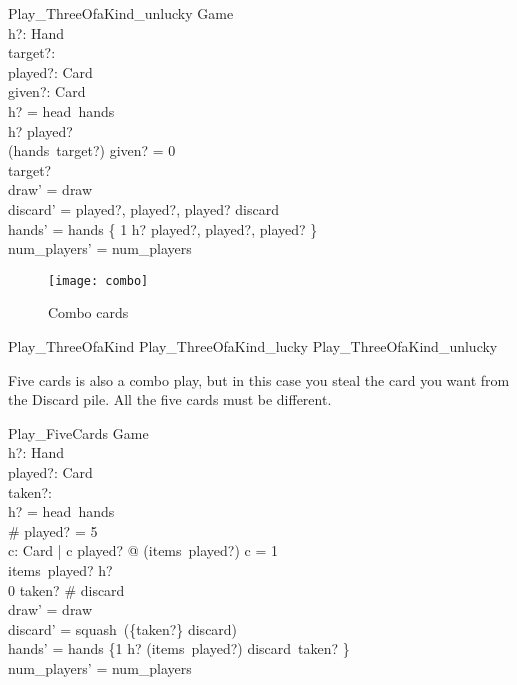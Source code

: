 \documentclass[11pt, fuzz]{article}
\begin{document}
\begin{schema}{Play\_ThreeOfaKind\_unlucky}
    \Delta Game \\
    h?: Hand \\
    target?: \nat \\
    played?: Card \\
    given?: Card \\
\where
    h? = head~hands \\
    h? \bcount played?  \\
    (hands~target?) \bcount given? = 0 \\
    target?  \\
    draw' = draw \\
    discard' = \langle played?, played?, played? \rangle \cat discard \\
    hands' = hands \oplus \{ 1 \mapsto h? \uminus \lbag played?, played?, played? \rbag \} \\
    num\_players' = num\_players
\end{schema}

\begin{figure}
    \texttt{[image: combo]}
    \caption{Combo cards}
\end{figure}


\begin{zed}
Play\_ThreeOfaKind  Play\_ThreeOfaKind\_lucky \lor Play\_ThreeOfaKind\_unlucky
\end{zed}


Five cards is also a combo play, but in this case you steal the card you want from the Discard pile. All the five cards must be different. 

\begin{schema}{Play\_FiveCards}
    \Delta Game \\
    h?: Hand \\
    played?: \seq Card \\
    taken?: \nat \\
\where
    h? = head~hands \\
    \# played? = 5 \\
    \forall c: Card | c \in \ran played? @ (items~played?) \bcount c = 1 \\ 
    items~played? \subbageq h? \\
    0 \leq taken? \leq \# discard \\
    draw' = draw \\
    discard' = squash~(\{taken?\} \ndres discard) \\ 
    hands' = hands \oplus \{1 \mapsto h? \uminus (items~played?) \uplus \lbag discard~taken? \rbag \} \\

    num\_players' = num\_players 
\end{schema}
\end{document}
